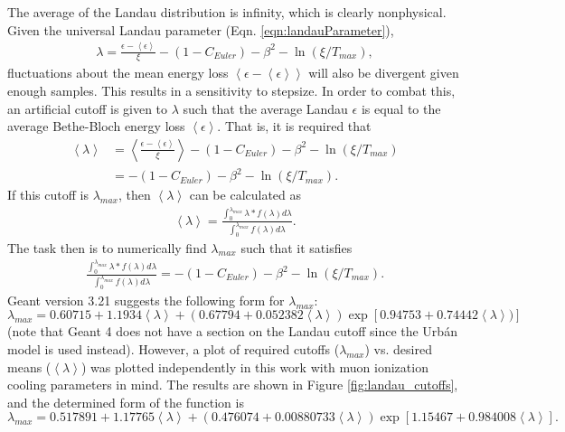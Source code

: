 The average of the Landau distribution is infinity, which is clearly nonphysical. Given the universal Landau parameter (Eqn. \ref{eqn:landauParameter}), 
\begin{align*}
\lambda=\frac{\epsilon-\left<\epsilon\right>}{\xi}-(1-C_{Euler})-\beta ^2 -\ln (\xi/T_{max}),
\end{align*}
fluctuations about the mean energy loss $\left<\epsilon-\left<\epsilon\right>\right>$ will also be divergent given enough samples. This results in a sensitivity to stepsize. In order to combat this, an artificial cutoff is given to $\lambda$ such that the average Landau $\epsilon$ is equal to the average Bethe-Bloch energy loss $\left<\epsilon\right>$. That is, it is required that
\begin{align*}
\left<\lambda\right>&=\left<\frac{\epsilon-\left<\epsilon\right>}{\xi}\right>-(1-C_{Euler})-\beta^2-\ln(\xi/T_{max})\\
&=-(1-C_{Euler})-\beta^2-\ln(\xi/T_{max}).
\end{align*}
If this cutoff is $\lambda_{max}$, then $\left<\lambda\right>$ can be calculated as
\begin{align*}
\left<\lambda\right>=\frac{\int_0 ^{\lambda_{max}} \lambda * f(\lambda) d\lambda}{\int_0 ^{\lambda_{max}}f(\lambda) d\lambda}.
\end{align*}
The task then is to numerically find $\lambda_{max}$ such that it satisfies
\begin{align*}
\frac{\int_0 ^{\lambda_{max}} \lambda * f(\lambda) d\lambda}{\int_0 ^{\lambda_{max}}f(\lambda) d\lambda}=-(1-C_{Euler})-\beta^2-\ln(\xi/T_{max}).
\end{align*}
Geant version 3.21 \cite{geant3.21} suggests the following form for $\lambda_{max}$:
\begin{equation} \label{eqn:landauCutoffsGeant3}
\lambda_{max}=0.60715+1.1934\left<\lambda\right>+(0.67794+0.052382\left<\lambda\right>)\exp[0.94753+0.74442\left<\lambda\right>)]
\end{equation}
(note that Geant 4 does not have a section on the Landau cutoff since the Urb\'{a}n model is used instead). However, a plot of required cutoffs ($\lambda_{max}$) vs. desired means ($\left<\lambda\right>$) was plotted independently in this work with muon ionization cooling parameters in mind. The results are shown in Figure \ref{fig:landau_cutoffs}, and the determined form of the function is
\begin{equation}\label{eqn:landauCutoffs}
\lambda_{max}=0.517891+1.17765\left<\lambda\right>+(0.476074+0.00880733\left<\lambda\right>)\exp[1.15467+0.984008\left<\lambda\right>].
\end{equation}

